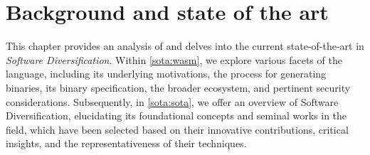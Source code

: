 \chapter{Background and state of the art}
\label{SOTA}

This chapter provides an analysis of \emph{\Wasm} and delves into the current state-of-the-art in \emph{Software Diversification}. 
Within \autoref{sota:wasm}, we explore various facets of the \Wasm language, including its underlying motivations, the process for generating \Wasm binaries, its binary specification, the broader ecosystem, and pertinent security considerations. 
Subsequently, in \autoref{sota:sota}, we offer an overview of Software Diversification, elucidating its foundational concepts and seminal works in the field, which have been selected based on their innovative contributions, critical insights, and the representativeness of their techniques.








